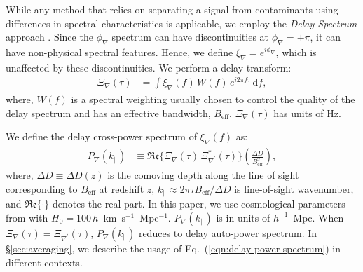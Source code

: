 \documentclass[
reprint,
superscriptaddress,
amsmath,
amssymb,
aps,
prd
]{revtex4-1}
\begin{document}
While any method that relies on separating a signal from contaminants using differences in spectral characteristics is applicable, we employ the {\it Delay Spectrum} approach \cite{par12a,par12b}. Since the $\phi_\nabla$ spectrum can have discontinuities at $\phi_\nabla=\pm\pi$, it can have non-physical spectral features. Hence, we define $\xi_\nabla = e^{i\phi_\nabla}$, which is unaffected by these discontinuities. We perform a delay transform:
\begin{align}\label{eqn:cpdspec}
  \Xi_\nabla(\tau) &= \int \xi_\nabla(f)\,W(f)\,e^{i2\pi f\tau}\,\mathrm{d}f,
\end{align}
where, $W(f)$ is a spectral weighting usually chosen to control the quality of the delay spectrum \citep{thy13,thy16} and has an effective bandwidth, $B_\textrm{eff}$. $\Xi_\nabla(\tau)$ has units of Hz. 

We define the delay cross-power spectrum of $\xi_\nabla(f)$ as:
\begin{align}
  P_\nabla(k_\parallel) &\equiv \mathfrak{Re}\bigg\{\Xi_\nabla(\tau)\,\Xi_{\nabla^\prime}^*(\tau)\bigg\} \left(\frac{\Delta D}{B_\textrm{eff}^2}\right), \label{eqn:delay-power-spectrum}
\end{align}
where, $\Delta D\equiv \Delta D(z)$ is the comoving depth along the line of sight corresponding to $B_\textrm{eff}$ at redshift $z$, $k_\parallel\approx 2\pi\tau B_\textrm{eff}/\Delta D$ is line-of-sight wavenumber, and $\mathfrak{Re}\{\cdot\}$ denotes the real part. In this paper, we use cosmological parameters from \cite{planck15xiii} with $H_0=100\,h$~km~s$^{-1}$~Mpc$^{-1}$. $P_\nabla(k_\parallel)$ is in units of $h^{-1}$~Mpc. When $\Xi_\nabla(\tau)=\Xi_{\nabla^\prime}(\tau)$, $P_\nabla(k_\parallel)$ reduces to delay auto-power spectrum. In \S\ref{sec:averaging}, we describe the usage of Eq.~(\ref{eqn:delay-power-spectrum}) in different contexts. 
\end{document}
